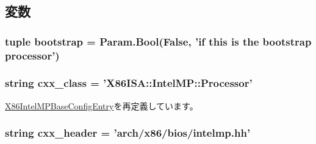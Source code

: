 \subsection{変数}
\hypertarget{classIntelMP_1_1X86IntelMPProcessor_a31b215e159e493a5899473c5acbfe726}{
\subsubsection[{bootstrap}]{\setlength{\rightskip}{0pt plus 5cm}tuple {\bf bootstrap} = Param.Bool(False, 'if this is the {\bf bootstrap} processor')}}
\label{classIntelMP_1_1X86IntelMPProcessor_a31b215e159e493a5899473c5acbfe726}
\hypertarget{classIntelMP_1_1X86IntelMPProcessor_a58cd55cd4023648e138237cfc0822ae3}{
\subsubsection[{cxx\_\-class}]{\setlength{\rightskip}{0pt plus 5cm}string {\bf cxx\_\-class} = '{\bf X86ISA::IntelMP::Processor}'}}
\label{classIntelMP_1_1X86IntelMPProcessor_a58cd55cd4023648e138237cfc0822ae3}


\hyperlink{classIntelMP_1_1X86IntelMPBaseConfigEntry_a58cd55cd4023648e138237cfc0822ae3}{X86IntelMPBaseConfigEntry}を再定義しています。\hypertarget{classIntelMP_1_1X86IntelMPProcessor_a17da7064bc5c518791f0c891eff05fda}{
\subsubsection[{cxx\_\-header}]{\setlength{\rightskip}{0pt plus 5cm}string {\bf cxx\_\-header} = 'arch/x86/bios/intelmp.hh'}}
\label{classIntelMP_1_1X86IntelMPProcessor_a17da7064bc5c518791f0c891eff05fda}


